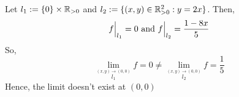 Let $ l_1 := \{0\}\times\mathbb{R}_{>0} $ and $ l_2 := \{(x,y) \in \mathbb{R}_{>0}^2 : y=2x \} $.
Then, 
$$
f\Big|_{l_1} = 0 \ {\rm and} \ f\Big|_{l_2} = \frac{1-8x}{5}
$$
So,
\[
  \lim_{\stackrel{(x,y) \to (0,0)}{l_1}} f = 0 \not= \lim_{\stackrel{(x,y) \to (0,0)}{l_2}} f = \frac{1}{5}
\]
Hence, the limit doesn't exist at $ (0,0) $ 

